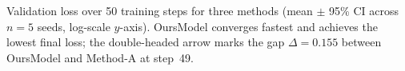 \caption{Validation loss over 50 training steps for three methods (mean $\pm$ 95\% CI across $n=5$ seeds, log-scale $y$-axis). OursModel converges fastest and achieves the lowest final loss; the double-headed arrow marks the gap $\Delta=0.155$ between OursModel and Method-A at step~49.}

